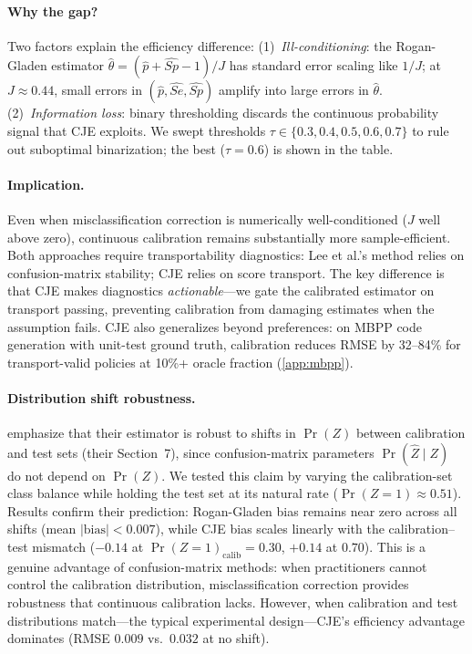 \paragraph{Why the gap?} Two factors explain the efficiency difference:
(1)~\emph{Ill-conditioning}: the Rogan-Gladen estimator $\hat\theta = (\hat p + \widehat{Sp} - 1)/J$ has standard error scaling like $1/J$; at $J \approx 0.44$, small errors in $(\hat p, \widehat{Se}, \widehat{Sp})$ amplify into large errors in $\hat\theta$.
(2)~\emph{Information loss}: binary thresholding discards the continuous probability signal that CJE exploits.
We swept thresholds $\tau \in \{0.3, 0.4, 0.5, 0.6, 0.7\}$ to rule out suboptimal binarization; the best ($\tau{=}0.6$) is shown in the table.

\paragraph{Implication.} Even when misclassification correction is numerically well-conditioned ($J$ well above zero), continuous calibration remains substantially more sample-efficient. Both approaches require transportability diagnostics: Lee et al.'s method relies on confusion-matrix stability; CJE relies on score transport. The key difference is that CJE makes diagnostics \emph{actionable}---we gate the calibrated estimator on transport passing, preventing calibration from damaging estimates when the assumption fails. CJE also generalizes beyond preferences: on MBPP code generation with unit-test ground truth, calibration reduces RMSE by 32--84\% for transport-valid policies at 10\%+ oracle fraction (\cref{app:mbpp}).

\paragraph{Distribution shift robustness.}
\citet{Lee2025LLMJudgeReporting} emphasize that their estimator is robust to shifts in $\Pr(Z)$ between calibration and test sets (their Section~7), since confusion-matrix parameters $\Pr(\hat Z \mid Z)$ do not depend on $\Pr(Z)$.
We tested this claim by varying the calibration-set class balance while holding the test set at its natural rate ($\Pr(Z{=}1) \approx 0.51$).
Results confirm their prediction: Rogan-Gladen bias remains near zero across all shifts (mean $|\mathrm{bias}| < 0.007$), while CJE bias scales linearly with the calibration--test mismatch ($-0.14$ at $\Pr(Z{=}1)_{\mathrm{calib}}{=}0.30$, $+0.14$ at $0.70$).
This is a genuine advantage of confusion-matrix methods: when practitioners cannot control the calibration distribution, misclassification correction provides robustness that continuous calibration lacks.
However, when calibration and test distributions match---the typical experimental design---CJE's efficiency advantage dominates (RMSE $0.009$ vs.\ $0.032$ at no shift).

